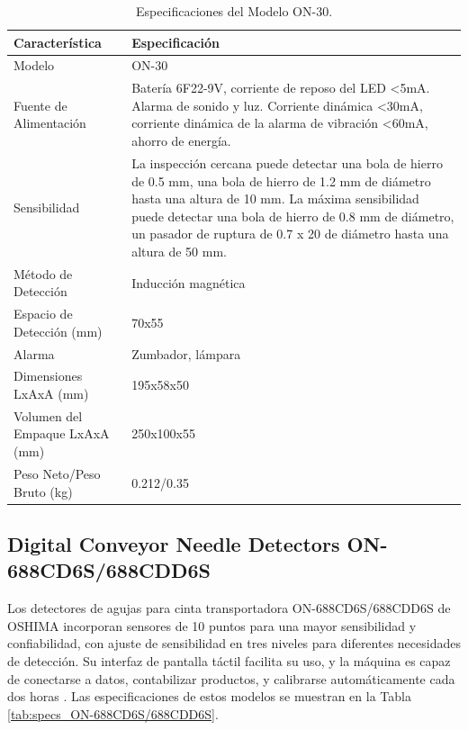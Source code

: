 \begin{table}[H]
	\caption{Especificaciones del Modelo ON-30.}
	\begin{tabularx}{\textwidth}{|l|X|}
		\hline
		\textbf{Característica} & \textbf{Especificación} \\ \hline
		Modelo & ON-30 \\ \hline
		Fuente de Alimentación & Batería 6F22-9V, corriente de reposo del LED <5mA. Alarma de sonido y luz. Corriente dinámica <30mA, corriente dinámica de la alarma de vibración <60mA, ahorro de energía. \\ \hline
		Sensibilidad & La inspección cercana puede detectar una bola de hierro de 0.5 mm, una bola de hierro de 1.2 mm de diámetro hasta una altura de 10 mm. La máxima sensibilidad puede detectar una bola de hierro de 0.8 mm de diámetro, un pasador de ruptura de 0.7 x 20 de diámetro hasta una altura de 50 mm. \\ \hline
		Método de Detección & Inducción magnética \\ \hline
		Espacio de Detección (mm) & 70x55 \\ \hline
		Alarma & Zumbador, lámpara \\ \hline
		Dimensiones LxAxA (mm) & 195x58x50 \\ \hline
		Volumen del Empaque LxAxA (mm) & 250x100x55 \\ \hline
		Peso Neto/Peso Bruto (kg) & 0.212/0.35 \\ \hline
	\end{tabularx}
	\label{tab:specs_ON_30}
\end{table}

\subsection{Digital Conveyor Needle Detectors ON-688CD6S/688CDD6S}

Los detectores de agujas para cinta transportadora ON-688CD6S/688CDD6S de OSHIMA incorporan sensores de 10 puntos para una mayor sensibilidad y confiabilidad, con ajuste de sensibilidad en tres niveles para diferentes necesidades de detección. Su interfaz de pantalla táctil facilita su uso, y la máquina es capaz de conectarse a datos, contabilizar productos, y calibrarse automáticamente cada dos horas \cite{oshimaOSHIMAGarment}. Las especificaciones de estos modelos se muestran en la Tabla \ref{tab:specs_ON-688CD6S/688CDD6S}.

